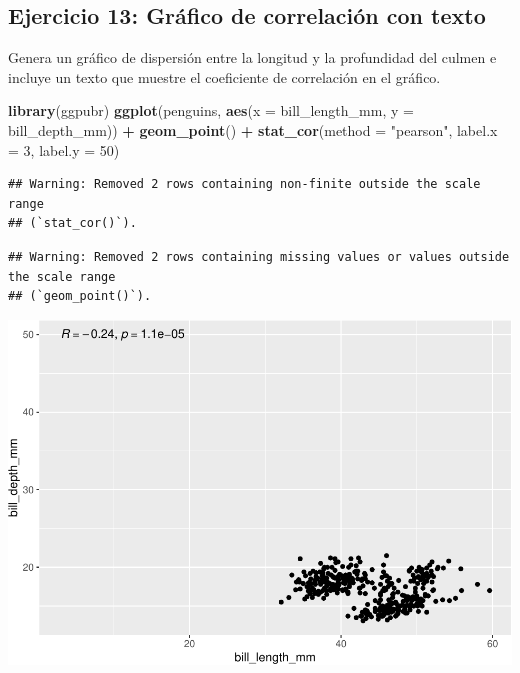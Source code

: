\documentclass[
]{book}
\newenvironment{Shaded}{\begin{snugshade}}{\end{snugshade}}
\newcommand{\AttributeTok}[1]{\textcolor[rgb]{0.13,0.29,0.53}{#1}}
\newcommand{\DecValTok}[1]{\textcolor[rgb]{0.00,0.00,0.81}{#1}}
\newcommand{\FunctionTok}[1]{\textcolor[rgb]{0.13,0.29,0.53}{\textbf{#1}}}
\newcommand{\NormalTok}[1]{#1}
\newcommand{\SpecialCharTok}[1]{\textcolor[rgb]{0.81,0.36,0.00}{\textbf{#1}}}
\newcommand{\StringTok}[1]{\textcolor[rgb]{0.31,0.60,0.02}{#1}}
\begin{document}
\hypertarget{ejercicio-13-gruxe1fico-de-correlaciuxf3n-con-texto-1}{%
\subsection{Ejercicio 13: Gráfico de correlación con texto}\label{ejercicio-13-gruxe1fico-de-correlaciuxf3n-con-texto-1}}

Genera un gráfico de dispersión entre la longitud y la profundidad del culmen e incluye un texto que muestre el coeficiente de correlación en el gráfico.

\begin{Shaded}
\begin{Highlighting}[]
\FunctionTok{library}\NormalTok{(ggpubr)}
\FunctionTok{ggplot}\NormalTok{(penguins, }\FunctionTok{aes}\NormalTok{(}\AttributeTok{x =}\NormalTok{ bill\_length\_mm, }\AttributeTok{y =}\NormalTok{ bill\_depth\_mm)) }\SpecialCharTok{+}
  \FunctionTok{geom\_point}\NormalTok{() }\SpecialCharTok{+}
  \FunctionTok{stat\_cor}\NormalTok{(}\AttributeTok{method =} \StringTok{"pearson"}\NormalTok{, }\AttributeTok{label.x =} \DecValTok{3}\NormalTok{, }\AttributeTok{label.y =} \DecValTok{50}\NormalTok{)}
\end{Highlighting}
\end{Shaded}

\begin{verbatim}
## Warning: Removed 2 rows containing non-finite outside the scale range
## (`stat_cor()`).
\end{verbatim}

\begin{verbatim}
## Warning: Removed 2 rows containing missing values or values outside the scale range
## (`geom_point()`).
\end{verbatim}

\includegraphics{bookdown-demo_files/figure-latex/unnamed-chunk-212-1.pdf}
\end{document}
